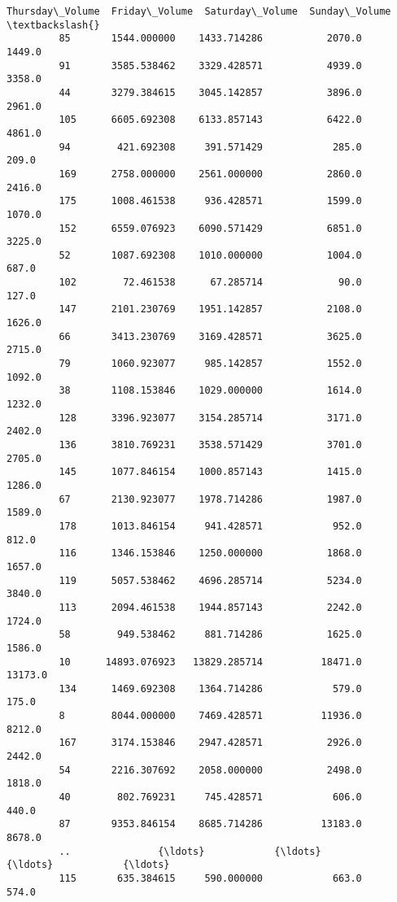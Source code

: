 \documentclass[11pt]{article}
\begin{document}
\begin{Verbatim}[commandchars=\\\{\}]
              Thursday\_Volume  Friday\_Volume  Saturday\_Volume  Sunday\_Volume  \textbackslash{}
         85       1544.000000    1433.714286           2070.0         1449.0   
         91       3585.538462    3329.428571           4939.0         3358.0   
         44       3279.384615    3045.142857           3896.0         2961.0   
         105      6605.692308    6133.857143           6422.0         4861.0   
         94        421.692308     391.571429            285.0          209.0   
         169      2758.000000    2561.000000           2860.0         2416.0   
         175      1008.461538     936.428571           1599.0         1070.0   
         152      6559.076923    6090.571429           6851.0         3225.0   
         52       1087.692308    1010.000000           1004.0          687.0   
         102        72.461538      67.285714             90.0          127.0   
         147      2101.230769    1951.142857           2108.0         1626.0   
         66       3413.230769    3169.428571           3625.0         2715.0   
         79       1060.923077     985.142857           1552.0         1092.0   
         38       1108.153846    1029.000000           1614.0         1232.0   
         128      3396.923077    3154.285714           3171.0         2402.0   
         136      3810.769231    3538.571429           3701.0         2705.0   
         145      1077.846154    1000.857143           1415.0         1286.0   
         67       2130.923077    1978.714286           1987.0         1589.0   
         178      1013.846154     941.428571            952.0          812.0   
         116      1346.153846    1250.000000           1868.0         1657.0   
         119      5057.538462    4696.285714           5234.0         3840.0   
         113      2094.461538    1944.857143           2242.0         1724.0   
         58        949.538462     881.714286           1625.0         1586.0   
         10      14893.076923   13829.285714          18471.0        13173.0   
         134      1469.692308    1364.714286            579.0          175.0   
         8        8044.000000    7469.428571          11936.0         8212.0   
         167      3174.153846    2947.428571           2926.0         2442.0   
         54       2216.307692    2058.000000           2498.0         1818.0   
         40        802.769231     745.428571            606.0          440.0   
         87       9353.846154    8685.714286          13183.0         8678.0   
         ..               {\ldots}            {\ldots}              {\ldots}            {\ldots}   
         115       635.384615     590.000000            663.0          574.0   

\end{Verbatim}
\end{document}

